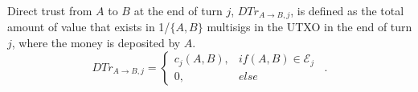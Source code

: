 {}
\begin{definition}
  Direct trust from $A$ to $B$ at the end of turn $j$, $DTr_{A \rightarrow B, j}$, is defined as the total amount of
  value that exists in 1/$\{A,B\}$ multisigs in the UTXO in the end of turn $j$, where the money is deposited by $A$.
  \begin{equation}
    DTr_{A \rightarrow B, j} =
      \begin{cases}
        c_j\left(A, B\right), & if \left(A, B\right) \in \mathcal{E}_j \\
        0, & else
      \end{cases} \enspace .
  \end{equation}
\end{definition}
